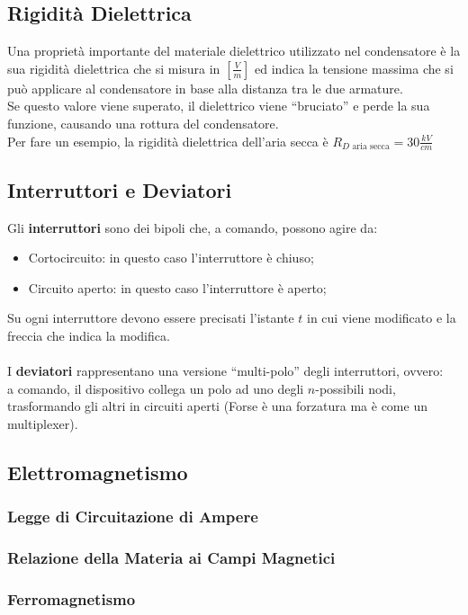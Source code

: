 \documentclass[../main.tex]{subfiles}
\begin{document}
	\subsection{Rigidità Dielettrica}
	Una proprietà importante del materiale dielettrico utilizzato nel condensatore è la sua rigidità dielettrica che si misura in $\left[ \frac{V}{m} \right]$ ed indica la tensione massima che si può applicare al condensatore in base alla distanza tra le due armature.\\
	Se questo valore viene superato, il dielettrico viene “bruciato” e perde la sua funzione, causando una rottura del
	condensatore.\\
	Per fare un esempio, la rigidità dielettrica dell'aria secca è $R_{D \text{ aria secca}} = 30 \frac{kV}{cm}$
	\subsection{Interruttori e Deviatori}
	Gli \textbf{interruttori} sono dei bipoli che, a comando, possono agire da:
	\begin{itemize}
		\item Cortocircuito: in questo caso l’interruttore è chiuso;
		\item Circuito aperto: in questo caso l’interruttore è aperto;
	\end{itemize}
	Su ogni interruttore devono essere precisati l’istante $t$ in cui viene modificato e la freccia che indica la modifica.\\\\
	I \textbf{deviatori} rappresentano una versione “multi-polo” degli interruttori, ovvero: \\
	a comando, il dispositivo collega un polo ad uno degli $n$-possibili nodi, trasformando gli altri in circuiti aperti (Forse è una forzatura ma è come un multiplexer).
	\subsection{Elettromagnetismo}
	\subsubsection{Legge di Circuitazione di Ampere}
	\subsubsection{Relazione della Materia ai Campi Magnetici}
	\subsubsection{Ferromagnetismo}
\end{document}
